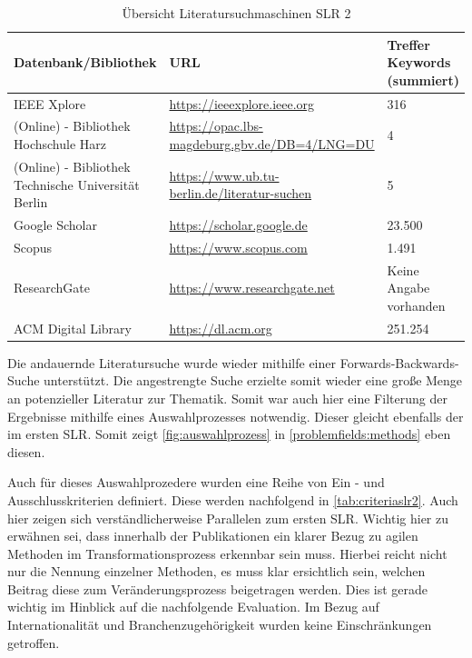 \begin{table}[ht]
	\centering
	\caption{Übersicht Literatursuchmaschinen SLR 2}
	\begin{tabular}{|p{5cm}|p{7cm}||p{3cm}|}
		\hline
		\textbf{Datenbank/Bibliothek}& \textbf{URL} &  \textbf{Treffer Keywords  (summiert)} \\
		\hline
		IEEE Xplore & \url{https://ieeexplore.ieee.org} & 316 \\
		(Online) - Bibliothek Hochschule Harz & \url{https://opac.lbs-magdeburg.gbv.de/DB=4/LNG=DU} & 4 \\
		(Online) - Bibliothek Technische Universität Berlin  & \url{https://www.ub.tu-berlin.de/literatur-suchen}& 5 \\
		Google Scholar &  \url{https://scholar.google.de}  & 23.500 \\
		Scopus & \url{https://www.scopus.com} & 1.491 \\
		ResearchGate & \url{https://www.researchgate.net} &Keine Angabe vorhanden \footnotemark \\ 
		ACM Digital Library & \url{https://dl.acm.org} & 251.254 \\
		\hline
	\end{tabular}
	\label{tab:suchmaschinenslr2}
\end{table}

Die andauernde Literatursuche wurde wieder mithilfe einer Forwards-Backwards-Suche unterstützt. Die angestrengte Suche erzielte somit wieder eine große Menge an potenzieller Literatur zur Thematik. Somit war auch hier eine Filterung der Ergebnisse mithilfe eines Auswahlprozesses notwendig. Dieser gleicht ebenfalls der im ersten SLR. Somit zeigt \ref{fig:auswahlprozess} in \ref{problemfields:methods} eben diesen. 

Auch für dieses Auswahlprozedere wurden eine Reihe von Ein - und Ausschlusskriterien definiert. Diese werden nachfolgend in \ref{tab:criteriaslr2}. Auch hier zeigen sich verständlicherweise Parallelen zum ersten SLR. Wichtig hier zu erwähnen sei, dass innerhalb der Publikationen ein klarer Bezug zu agilen Methoden im Transformationsprozess erkennbar sein muss. Hierbei reicht nicht nur die Nennung einzelner Methoden, es muss klar ersichtlich sein, welchen Beitrag diese zum Veränderungsprozess beigetragen werden. Dies ist gerade wichtig im Hinblick auf die nachfolgende Evaluation. Im Bezug auf Internationalität und Branchenzugehörigkeit wurden keine Einschränkungen getroffen.

